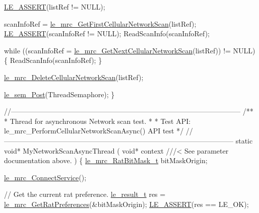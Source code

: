 \begin{DoxyCodeInclude}
{{{{{{    \hyperlink{le__log_8h_ac0dbbef91dc0fed449d0092ff0557b39}{LE\_ASSERT}(listRef != NULL);

    scanInfoRef = \hyperlink{le__mrc__interface_8h_ae006d053b037cec589aa85053472a2af}{le\_mrc\_GetFirstCellularNetworkScan}(listRef);
    \hyperlink{le__log_8h_ac0dbbef91dc0fed449d0092ff0557b39}{LE\_ASSERT}(scanInfoRef != NULL);
    ReadScanInfo(scanInfoRef);

    \textcolor{keywordflow}{while} ((scanInfoRef = \hyperlink{le__mrc__interface_8h_ae0ca9f0c1c106d6ddeef784c6bb0d69b}{le\_mrc\_GetNextCellularNetworkScan}(listRef)) != 
      NULL)
    \{
        ReadScanInfo(scanInfoRef);
    \}

    \hyperlink{le__mrc__interface_8h_ac45ce335b3fa063b83bb925e67eeaeb3}{le\_mrc\_DeleteCellularNetworkScan}(listRef);

    \hyperlink{le__semaphore_8h_abb859411cc58fbcc576c986ef52083b2}{le\_sem\_Post}(ThreadSemaphore);
\}


\textcolor{comment}{//--------------------------------------------------------------------------------------------------}\textcolor{comment}{}
\textcolor{comment}{/**}
\textcolor{comment}{ * Thread for asynchronous Network scan test.}
\textcolor{comment}{ *}
\textcolor{comment}{ * Test API: le\_mrc\_PerformCellularNetworkScanAsync() API test}
\textcolor{comment}{ */}
\textcolor{comment}{//--------------------------------------------------------------------------------------------------}
\textcolor{keyword}{static} \textcolor{keywordtype}{void}* MyNetworkScanAsyncThread
(
    \textcolor{keywordtype}{void}* context   \textcolor{comment}{///< See parameter documentation above.}
\textcolor{comment}{})
\{
    \hyperlink{le__mrc__interface_8h_af643c7005da7f2466302eebdf7a29d93}{le\_mrc\_RatBitMask\_t} bitMaskOrigin;

    \hyperlink{le__mrc__interface_8h_aa19103931ad3974ee014f0ce2705a4ff}{le\_mrc\_ConnectService}();

    \textcolor{comment}{// Get the current rat preference.}
    \hyperlink{le__basics_8h_a1cca095ed6ebab24b57a636382a6c86c}{le\_result\_t} res = \hyperlink{le__mrc__interface_8h_ae9fa8655738c63e392c8dcc862bdb1d5}{le\_mrc\_GetRatPreferences}(&bitMaskOrigin);
    \hyperlink{le__log_8h_ac0dbbef91dc0fed449d0092ff0557b39}{LE\_ASSERT}(res == LE\_OK);

}}}}}}
\end{DoxyCodeInclude}
